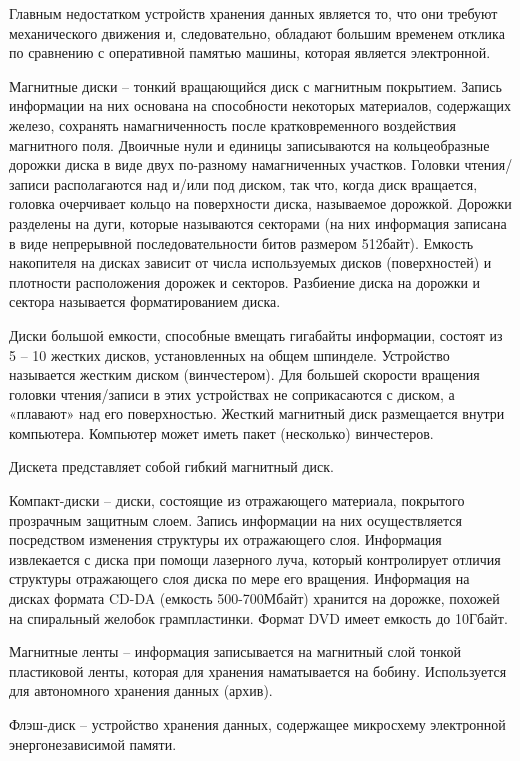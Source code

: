 \documentclass[a4paper]{article}
\begin{document}
Главным недостатком устройств хранения данных является то, что они требуют механического движения и, следовательно, обладают большим временем отклика по сравнению с оперативной памятью машины, которая является электронной.

Магнитные диски – тонкий вращающийся диск с магнитным покрытием. Запись информации на них основана на способности некоторых материалов, содержащих железо, сохранять намагниченность после кратковременного воздействия магнитного поля. Двоичные нули и единицы записываются на кольцеобразные дорожки диска в виде двух по-разному намагниченных участков. Головки чтения/записи располагаются над и/или под диском, так что, когда диск вращается, головка очерчивает кольцо на поверхности диска, называемое дорожкой. Дорожки разделены на дуги, которые называются секторами (на них информация записана в виде непрерывной последовательности битов размером 512байт). Емкость накопителя на дисках зависит от числа используемых дисков (поверхностей) и плотности расположения дорожек и секторов. Разбиение диска на дорожки и сектора называется форматированием диска.

Диски большой емкости, способные вмещать гигабайты информации, состоят из 5 – 10 жестких дисков, установленных на общем шпинделе. Устройство называется жестким диском (винчестером). Для большей скорости вращения головки чтения/записи в этих устройствах не соприкасаются с диском, а «плавают» над его поверхностью. Жесткий магнитный диск размещается внутри компьютера. Компьютер может иметь пакет (несколько) винчестеров.

Дискета представляет собой гибкий магнитный диск.

Компакт-диски – диски, состоящие из отражающего материала, покрытого прозрачным защитным слоем. Запись информации на них осуществляется посредством изменения структуры их отражающего слоя. Информация извлекается с диска при помощи лазерного луча, который контролирует отличия структуры отражающего слоя диска по мере его вращения. Информация на дисках формата CD-DA (емкость 500-700Мбайт) хранится на дорожке, похожей на спиральный желобок грампластинки. Формат DVD имеет емкость до 10Гбайт.

Магнитные ленты – информация записывается на магнитный слой тонкой пластиковой ленты, которая для хранения наматывается на бобину. Используется для автономного хранения данных (архив).

Флэш-диск – устройство хранения данных, содержащее микросхему электронной энергонезависимой памяти.
\end{document}
